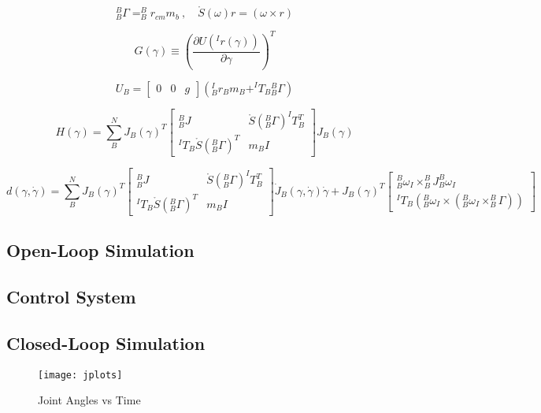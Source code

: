 \[
^B_B\Gamma = ^B_Br_{cm}m_b~,\quad \mathring{S}(\omega)r=(\omega\times r)
\]

\[
G(\gamma) \equiv \left(\frac{\partial U(^Ir(\gamma))}{\partial\gamma}\right)^T
\]

\[
U_B = \begin{bmatrix} 0 & 0 & g\end{bmatrix}\left(^I_Br_Bm_B + ^IT_B{}_B^B\Gamma\right)
\]

\begin{equation}
  \renewcommand{\arraystretch}{1.5}
  H(\gamma) = \sum_B^N J_B(\gamma)^T
  \begin{bmatrix}
    ^B_BJ & \mathring{S}(^B_B\Gamma) ^IT_B^T\\
    ^IT_B\mathring{S}(^B_B\Gamma)^T & m_BI
  \end{bmatrix}
  J_B(\gamma)
\end{equation}

\begin{equation}
  \renewcommand{\arraystretch}{1.5}
  d(\gamma,\dot{\gamma}) = \sum_B^N J_B(\gamma)^T
  \begin{bmatrix}
    ^B_BJ & \mathring{S}(^B_B\Gamma) ^IT_B^T\\
    ^IT_B\mathring{S}(^B_B\Gamma)^T & m_BI
  \end{bmatrix}
  \dot{J}_B(\gamma,\dot{\gamma})\dot{\gamma}+J_B(\gamma)^T
  \begin{bmatrix}
    ^B_B\omega_I \times ^B_BJ ^B_B\omega_I \\
    ^IT_B\left(^B_B\omega_I\times(^B_B\omega_I\times^B_B\Gamma)\right)
  \end{bmatrix}
\end{equation}



\newpage
\subsection{Open-Loop Simulation}
\newpage
\subsection{Control System}
\newpage
\subsection{Closed-Loop Simulation}
\begin{figure}[htp]
  \center
  \texttt{[image: jplots]}
  \caption{Joint Angles vs Time}
  \label{fig:jplots}
\end{figure}

